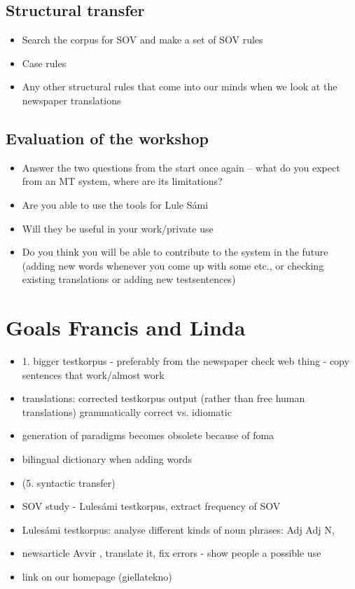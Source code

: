 \documentclass[a4paper,english,12pt]{article}
\begin{document}
\subsection{Structural transfer} 

\begin{itemize}
\item Search the corpus for SOV and make a set of SOV rules
\item Case rules
\item Any other structural rules that come into our minds when we look at the newspaper translations
\end{itemize}

\subsection{Evaluation of the workshop} 
\begin{itemize}
\item Answer the two questions from the start once again -- what do you expect from an MT system, where are its limitations?
\item Are you able to use the tools for Lule Sámi 
\item Will they be useful in your work/private use
\item Do you think you will be able to contribute to the system in the future (adding new words whenever you come up with some etc., or checking existing translations or adding new testsentences)
\end{itemize}
 

\section{Goals Francis and Linda}

\begin{itemize}
\item 1. bigger testkorpus - preferably from the newspaper
check web thing - copy sentences that work/almost work
\item translations: corrected testkorpus output (rather than free human translations) grammatically correct vs. idiomatic 
\item generation of paradigms becomes obsolete because of foma
\item bilingual dictionary when adding words
\item (5. syntactic transfer)
\item SOV study - Lulesámi testkorpus, extract frequency of SOV
\item Lulesámi testkorpus: analyse different kinds of noun phrases: Adj Adj N, 
\item newsarticle Avvir , translate it, fix errors - show people a possible use
\item link on our homepage (giellatekno)
\end{itemize}   
    
\end{document}
